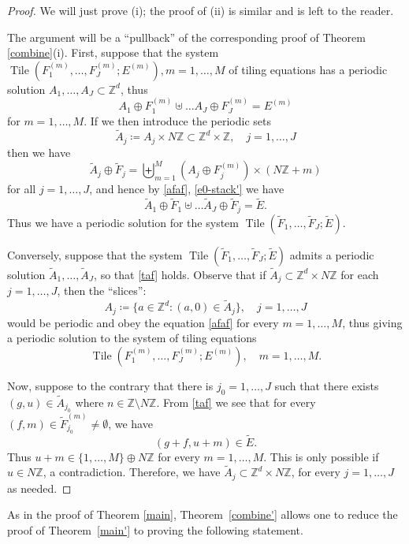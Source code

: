 \documentclass[reqno,a4paper,12pt]{amsart}
\numberwithin{equation}{section}
\numberwithin{figure}{section}
\def\Z{\mathbb{Z}}
\newcommand{\Tile}{\operatorname{Tile}}
\theoremstyle{plain}
\theoremstyle{definition}
\newcommand{\thmref}[1]{Theorem~\ref{#1}}
\begin{document}
\begin{proof}
We will just prove (i); the proof of (ii) is similar and is left to the reader.  

The argument will be a ``pullback'' of the corresponding proof of Theorem \ref{combine}(i). 
 First, suppose that the system $\Tile(F_1^{(m)},\dots,F_J^{(m)}; E^{(m)}), m=1,\dots,M$ of tiling equations has a periodic solution $A_1,\dots,A_J \subset \Z^d$, thus
 \begin{equation}\label{afaf} 
 A_1 \oplus F_1^{(m)} \uplus \dots A_J \oplus F_J^{(m)} = E^{(m)}
 \end{equation}
 for $m=1,\dots,M$.  If we then introduce the periodic sets 
 $$\tilde A_j \coloneqq A_j\times N\Z \subset \Z^d \times \Z,\quad j=1,\dots,J$$
 then we have
 $$ \tilde A_j \oplus \tilde F_j = \biguplus_{m=1}^M (A_j \oplus F_j^{(m)}) \times (N\Z+m)$$
 for all $j=1,\dots,J$, and hence by \eqref{afaf}, \eqref{e0-stack'} we have
 \begin{equation}\label{taf}
 \tilde A_1 \oplus \tilde F_1 \uplus \dots \tilde A_J \oplus \tilde F_j = \tilde E.
 \end{equation}
Thus we have a periodic solution for the system
 $\Tile(\tilde F_1,\dots,\tilde F_J; \tilde E)$.
 
 Conversely, suppose that the system $\Tile(\tilde F_1,\dots,\tilde F_J; \tilde E)$ admits a periodic solution $\tilde A_1,\dots,\tilde A_J$, so that \eqref{taf} holds. Observe that if  $\tilde A_j\subset \Z^d \times N\Z$ for each $j=1,\dots,J$, then the ``slices'':
 $$A_j \coloneqq \{a\in\Z^d: (a,0)\in\tilde A_j\},\quad j=1,\dots, J$$
would be periodic and obey the equation \eqref{afaf} for every $m=1,\dots,M$, thus giving a periodic solution to the system of tiling equations $$\Tile(F_1^{(m)},\dots,F_J^{(m)}; E^{(m)}), \quad  m=1,\dots,M.$$

Now, suppose to the contrary that there is  $j_0 = 1,\dots,J$  such that there exists $(g,u)\in \tilde A_{j_0}$ where $n\in\Z\setminus N\Z$. 
From \eqref{taf} we see that for every $(f,m)\in\tilde F_{j_0}^{(m)}\neq \emptyset$, we have 
$$(g+f,u+m)\in \tilde E.$$ Thus $u+m\in \{1,\dots,M\}\oplus N\Z$ for every  $m = 1,\dots,M$. This is only possible if $u\in N\Z$, a contradiction.
Therefore, we have $\tilde A_j\subset \Z^d\times N\Z$,  for every $j = 1,\dots,J$ as needed.
\end{proof}

As in the proof of Theorem \ref{main},   \thmref{combine'} allows one to reduce the proof of \thmref{main'} to proving the following statement.
\end{document}
